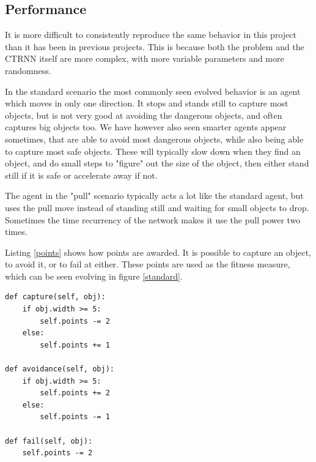 \documentclass[twoside]{article}
\begin{document}
\begin{multicols}{2}
    \section{Performance}
    It is more difficult to consistently reproduce the same behavior in this project than it has been in previous projects.
    This is because both the problem and the CTRNN itself are more complex,
    with more variable parameters and more randomness.

    In the standard scenario the most commonly seen evolved behavior is an agent which moves in only one direction.
    It stops and stands still to capture most objects,
    but is not very good at avoiding the dangerous objects,
    and often captures big objects too.
    We have however also seen smarter agents appear sometimes,
    that are able to avoid most dangerous objects,
    while also being able to capture most safe objects.
    These will typically slow down when they find an object,
    and do small steps to "figure" out the size of the object,
    then either stand still if it is safe or accelerate away if not.

    The agent in the "pull" scenario typically acts a lot like the standard agent,
    but uses the pull move instead of standing still and waiting for small objects to drop.
    Sometimes the time recurrency of the network makes it use the pull power two times.

    Listing \ref{points} shows how points are awarded.
    It is possible to capture an object, to avoid it, or to fail at either.
    These points are used as the fitness measure, which can be seen evolving in figure \ref{standard}.

    \begin{lstlisting}[caption=Awarding points which are used for fitness measure, label=points]
def capture(self, obj):
    if obj.width >= 5:
        self.points -= 2
    else:
        self.points += 1

def avoidance(self, obj):
    if obj.width >= 5:
        self.points += 2
    else:
        self.points -= 1

def fail(self, obj):
    self.points -= 2
    \end{lstlisting}


\end{multicols}
\end{document}
